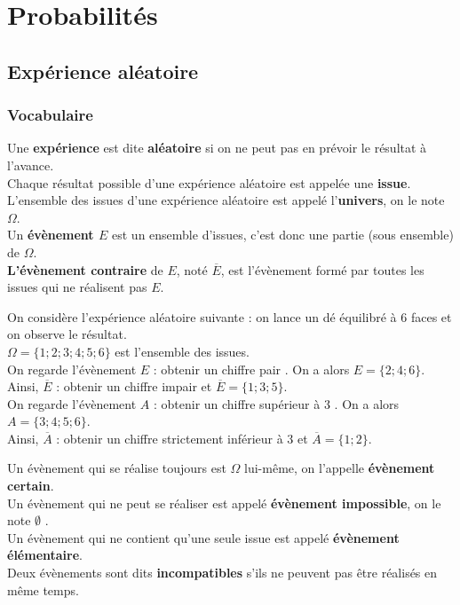 


\chapter{Probabilités}




\section{Expérience aléatoire}
\subsection{Vocabulaire}
\begin{Définition}
Une {\bf{expérience}} est dite {\bf{aléatoire}} si on ne peut pas en prévoir le résultat à l'avance.\\
Chaque résultat possible d'une expérience aléatoire est appelée une {\bf{issue}}.\\
L'ensemble des issues d'une expérience aléatoire est appelé l'{\bf{univers}}, on le note $\Omega$.\\
Un {\bf{évènement $E$}} est un ensemble d'issues, c'est donc une partie (sous ensemble) de $\Omega$. \\
{\bf{L'évènement contraire}} de $E$, noté $\overline{E}$, est l'évènement formé par toutes les issues qui ne réalisent
pas $E$.

\end{Définition}

\begin{Exemple}
On considère l'expérience aléatoire suivante : on lance un dé équilibré à $6$ faces et on observe le résultat.\\
$\Omega=\{1;2;3;4;5;6\}$ est l'ensemble des issues.\\
On regarde l'évènement $E$ : \og obtenir un chiffre pair \fg{}. On a alors $E=\{2;4;6\}$.\\
Ainsi, $\overline{E}$ : \og obtenir un chiffre impair \fg{} et $\overline{E}=\{1;3;5\}$.\\
On regarde l'évènement $A$ : \og obtenir un chiffre supérieur à $3$ \fg{}. On a alors $A=\{3;4;5;6\}$.\\
Ainsi, $\overline{A}$ : \og obtenir un chiffre strictement inférieur à $3$ \fg{} et $\overline{A}=\{1;2\}$.


\end{Exemple}

\begin{Définition}
Un évènement qui se réalise toujours est $\Omega$ lui-même, on l'appelle {\bf{évènement certain}}. \\
Un évènement qui ne peut se réaliser est appelé {\bf{évènement impossible}}, on le note $\emptyset$ . \\
Un évènement qui ne contient qu'une seule issue est appelé {\bf{évènement élémentaire}}.\\
Deux évènements sont dits {\bf{incompatibles}} s'ils ne peuvent pas être réalisés en même temps.
\end{Définition}

